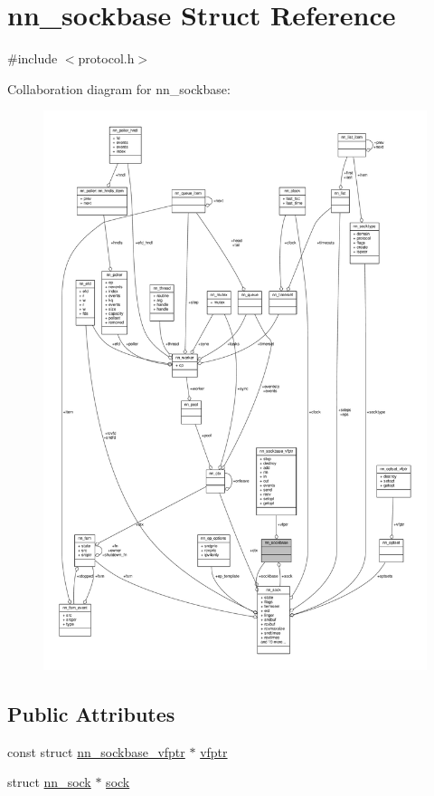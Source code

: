 \hypertarget{structnn__sockbase}{}\section{nn\+\_\+sockbase Struct Reference}
\label{structnn__sockbase}


{\ttfamily \#include $<$protocol.\+h$>$}



Collaboration diagram for nn\+\_\+sockbase\+:\nopagebreak
\begin{figure}[H]
\begin{center}
\leavevmode
\includegraphics[width=350pt]{structnn__sockbase__coll__graph}
\end{center}
\end{figure}
\subsection*{Public Attributes}
\begin{DoxyCompactItemize}
\item 
const struct \hyperlink{structnn__sockbase__vfptr}{nn\+\_\+sockbase\+\_\+vfptr} $\ast$ \hyperlink{structnn__sockbase_a8e1306c5c153b58c9aa74a100ffa1faf}{vfptr}
\item 
struct \hyperlink{structnn__sock}{nn\+\_\+sock} $\ast$ \hyperlink{structnn__sockbase_a1a189b35cfe4078398f47c623a1083cd}{sock}
\end{DoxyCompactItemize}


